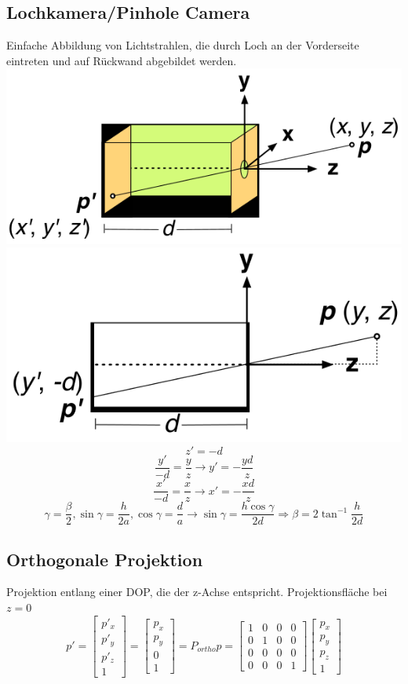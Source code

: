 \documentclass[12pt]{article}
\begin{document}
	\subsection{Lochkamera/Pinhole Camera}
	Einfache Abbildung von Lichtstrahlen, die durch Loch an der Vorderseite eintreten und auf Rückwand abgebildet werden.\\
	\includegraphics[width=0.5\linewidth]{figures/pinhole-camera1.png}
	\includegraphics[width=0.5\linewidth]{figures/pinhole-camera2.png}
	$$z' = -d$$
	$$\frac{y'}{-d} = \frac{y}{z} \rightarrow y' = -\frac{y d}{z}$$
	$$\frac{x'}{-d} = \frac{x}{z} \rightarrow x' = -\frac{x d}{z}$$
	$$\gamma = \frac{\beta}{2}, \sin \gamma = \frac{h}{2a}, \cos \gamma = \frac{d}{a} \rightarrow \sin \gamma = \frac{h \cos \gamma}{2d} \Rightarrow \beta = 2 \tan^{-1} \frac{h}{2d}$$

	\subsection{Orthogonale Projektion}
	Projektion entlang einer DOP, die der z-Achse entspricht. Projektionsfläche bei $z=0$
	$$p' =
	\begin{bmatrix}
		p'_x\\
		p'_y\\
		p'_z\\
		1
	\end{bmatrix} = 
	\begin{bmatrix}
		p_x\\
		p_y\\
		0\\
		1
	\end{bmatrix} = 
	P_{ortho} p = 
	\begin{bmatrix}
		1 & 0 & 0 & 0 \\
		0 & 1 & 0 & 0 \\
		0 & 0 & 0 & 0 \\
		0 & 0 & 0 & 1
	\end{bmatrix}
	\begin{bmatrix}
		p_x\\
		p_y\\
		p_z\\
		1
	\end{bmatrix}
	$$
\end{document}
